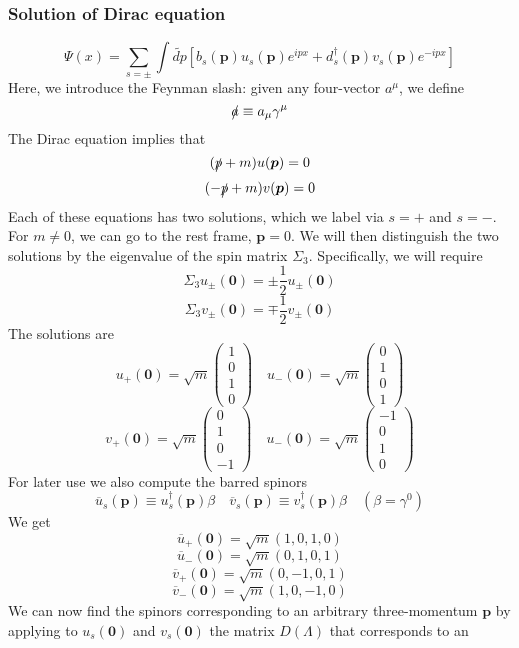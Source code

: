 \subsubsection{Solution of Dirac equation}
\[\Psi(x) = \sum_{s = \pm} \int \widetilde{dp} \left[ b_s(\bm{p})u_s(\bm{p}) e^{ipx} + d^{\dagger}_s(\bm{p})v_s(\bm{p}) e^{-ipx}\right]\]
Here, we introduce the Feynman slash: given any four-vector $a^{\mu}$, we define
\[\slashed{a} \equiv a_{\mu} \gamma^{\mu}\]
The Dirac equation implies that
\[(\slashed{p}+m)u(\bm{p}) = 0\]
\[(-\slashed{p}+m)v(\bm{p}) = 0\]
Each of these equations has two solutions, which we label via $s=+$ and $s=-$. For $m \neq 0$, we can go to the rest frame, $\bm{p} = 0$. We will then distinguish the two solutions by the eigenvalue of the spin matrix $\Sigma_3$. Specifically, we will require
\[\Sigma_3 u_{\pm}(\bm{0}) = \pm \frac{1}{2} u_{\pm}(\bm{0})\]
\[\Sigma_3 v_{\pm}(\bm{0}) = \mp \frac{1}{2} v_{\pm}(\bm{0})\]
The solutions are
\[u_{+}(\bm{0}) = \sqrt{m} \left( \begin{matrix} 1\\ 0\\ 1 \\ 0\end{matrix} \right) \quad u_{-}(\bm{0}) = \sqrt{m} \left( \begin{matrix} 0\\ 1\\ 0 \\ 1\end{matrix} \right) \]
\[v_{+}(\bm{0}) = \sqrt{m} \left( \begin{matrix} 0\\ 1\\ 0 \\ -1\end{matrix} \right) \quad u_{-}(\bm{0}) = \sqrt{m} \left( \begin{matrix} -1\\ 0\\ 1 \\ 0\end{matrix} \right) \]
For later use we also compute the barred spinors
\[\overline{u}_s(\bm{p}) \equiv u^{\dagger}_s(\bm{p})\beta \quad \overline{v}_s(\bm{p}) \equiv v^{\dagger}_s(\bm{p})\beta \quad (\beta = \gamma^0)\]
We get
\[\overline{u}_{+}(\bm{0}) = \sqrt{m} (1,0,1,0)\]
\[\overline{u}_{-}(\bm{0}) = \sqrt{m} (0,1,0,1)\]
\[\overline{v}_{+}(\bm{0}) = \sqrt{m} (0,-1,0,1)\]
\[\overline{v}_{-}(\bm{0}) = \sqrt{m} (1,0,-1,0)\]
We can now find the spinors corresponding to an arbitrary three-momentum $\bm{p}$ by applying to $u_s(\bm{0})$ and $v_s(\bm{0})$ the matrix $D(\Lambda)$ that corresponds to an
